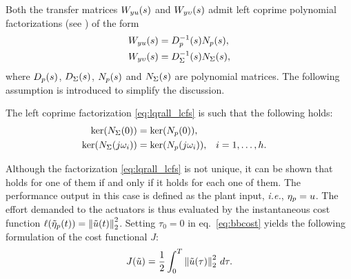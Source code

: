 Both the transfer matrices $W_{yu}(s)$ and $W_{y\upsilon}(s)$ admit left coprime polynomial factorizations (see \cite[§7.8]{chen_linear_2009}) of the form
\begin{subequations}
	\label{eq:lqrall_lcfs}
	\begin{align}
		W_{yu}(s)      & = D_p^{-1}(s)N_p(s)\label{eq:lqrall_plantlcf}, \\
		W_{y\upsilon}(s)   & = D_\Sigma^{-1}(s)N_\Sigma(s)\label{eq:lqrall_looplcf},
	\end{align}
\end{subequations}
where $D_p(s)$, $D_\Sigma(s)$, $N_p(s)$ and $N_\Sigma(s)$ are polynomial matrices. The following assumption is introduced to simplify the discussion.
\begin{assumption}
  \label{ass:lqrall_kernels}
  The left coprime factorization \eqref{eq:lqrall_lcfs} is such that the following holds:
	\begin{subequations}
		\label{eq:lqrall_kernels}
		\begin{align}
			 \ker(N_\Sigma(0)) &= \ker(N_p(0)),                                   \\
			 \ker(N_\Sigma(j\omega_i)) &= \ker(N_p(j\omega_i)), &  & i=1,\dotsc,h.
		\end{align}
	\end{subequations}
	\closestatement
\end{assumption}

Although the factorization \eqref{eq:lqrall_lcfs} is not unique, it can be shown that  holds for one of them if and only if it holds for each one of them. The performance output in this case is defined as the plant input, \emph{i.e.}, $\eta_p = u$. The effort demanded to the actuators is thus evaluated by the instantaneous cost function $\ell(\tilde{\eta}_p(t)) = \left\Vert \tilde{u}(t) \right\Vert^2_2$. Setting $\tau_0=0$ in eq.~\eqref{eq:bbcost} yields the following formulation of the cost functional $J$:
\begin{equation}
  \label{eq:lqrall_sscost}
  J(\tilde{u}) = \frac{1}{2} \int_{0}^{T} \left\Vert \tilde{u}(\tau) \right\Vert^2_2\,d\tau.
\end{equation}

